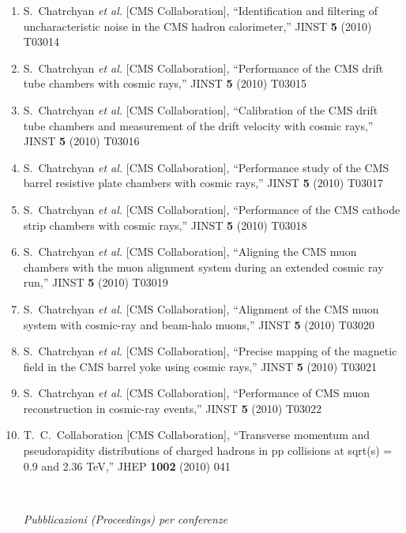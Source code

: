 \documentclass[10pt]{letter}
\begin{document}
\begin{enumerate}
\item S.~Chatrchyan {\it et al.}  [CMS Collaboration],
  ``Identification and filtering of uncharacteristic noise in the CMS hadron calorimeter,''
  JINST {\bf 5} (2010) T03014

\item S.~Chatrchyan {\it et al.}  [CMS Collaboration],
  ``Performance of the CMS drift tube chambers with cosmic rays,''
  JINST {\bf 5} (2010) T03015

\item S.~Chatrchyan {\it et al.}  [CMS Collaboration],
  ``Calibration of the CMS drift tube chambers and measurement of the drift velocity with cosmic rays,''
  JINST {\bf 5} (2010) T03016

\item S.~Chatrchyan {\it et al.}  [CMS Collaboration],
  ``Performance study of the CMS barrel resistive plate chambers with cosmic rays,''
  JINST {\bf 5} (2010) T03017

\item S.~Chatrchyan {\it et al.}  [CMS Collaboration],
  ``Performance of the CMS cathode strip chambers with cosmic rays,''
  JINST {\bf 5} (2010) T03018

\item S.~Chatrchyan {\it et al.}  [CMS Collaboration],
  ``Aligning the CMS muon chambers with the muon alignment system during an extended cosmic ray run,''
  JINST {\bf 5} (2010) T03019

\item S.~Chatrchyan {\it et al.}  [CMS Collaboration],
  ``Alignment of the CMS muon system with cosmic-ray and beam-halo muons,''
  JINST {\bf 5} (2010) T03020

\item S.~Chatrchyan {\it et al.}  [CMS Collaboration],
  ``Precise mapping of the magnetic field in the CMS barrel yoke using cosmic rays,''
  JINST {\bf 5} (2010) T03021

\item S.~Chatrchyan {\it et al.}  [CMS Collaboration],
  ``Performance of CMS muon reconstruction in cosmic-ray events,''
  JINST {\bf 5} (2010) T03022

\item T.~C.~Collaboration  [CMS Collaboration],
  ``Transverse momentum and pseudorapidity distributions of charged hadrons in pp collisions at sqrt(s) = 0.9 and 2.36 TeV,''
  JHEP {\bf 1002} (2010) 041


~\\
\begin{center} \textit{Pubblicazioni (Proceedings) per conferenze} \\ 
\end{center}


\end{enumerate}
\end{document}
